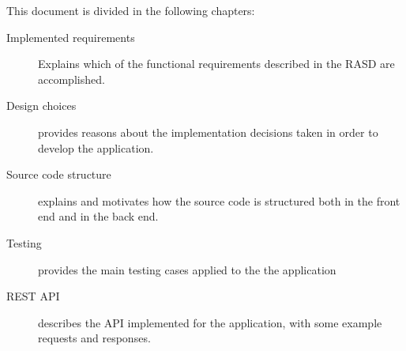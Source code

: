 This document is divided in the following chapters:
\begin{description}
\item[Implemented requirements] Explains which of the functional requirements described in the RASD are accomplished.
\item[Design choices] provides reasons about the implementation decisions taken in order to develop the application.
\item[Source code structure] explains and motivates how the source code is structured both in the front end and in the back end.
\item[Testing] provides the main testing cases applied to the the application
\item[REST API] describes the API implemented for the application, with some example requests and responses.
\end{description}